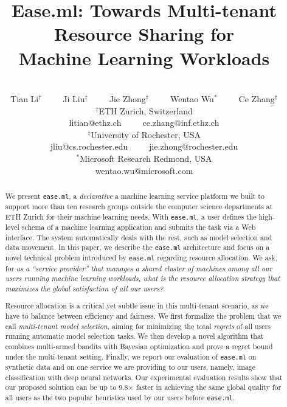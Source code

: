 \documentclass[letterpaper]{vldb}
\newcommand{\eml}{\texttt{ease.ml}\xspace}
\begin{document}


\title{Ease.ml: Towards Multi-tenant Resource Sharing for \\
Machine Learning Workloads}

\author{
\vspace{-1.1em}
~\\
Tian Li$^\dagger$~~~~~Ji Liu$^\ddagger$~~~~~Jie Zhong$^\ddagger$~~~~~Wentao Wu$^*$~~~~~Ce Zhang$^\dagger$\\
\small $^\dagger$ETH Zurich, Switzerland\\
\small litian@ethz.ch~~~~~ce.zhang@inf.ethz.ch\\
\small $^\ddagger$University of Rochester, USA\\
\small jliu@cs.rochester.edu~~~~~jie.zhong@rochester.edu\\
\small $^*$Microsoft Research Redmond, USA\\
\small wentao.wu@microsoft.com
}

\maketitle

\begin{abstract}
We present \eml, a \emph{declarative} a machine learning service platform we built
to support more than ten research groups outside the computer science departments at ETH Zurich 
for their machine learning needs.
With \eml, a user defines the high-level 
schema of a machine learning application and submits
the task via a Web interface. The system automatically deals with the rest, such as model selection and data movement.
In this paper, we describe the \eml architecture and focus on
a novel technical problem introduced by \eml regarding resource allocation.
We ask, {for \em as a ``service provider'' that manages a shared cluster of 
machines among all our users running machine learning workloads, what is the resource
allocation strategy that maximizes the global satisfaction of all
our users?}


Resource allocation is a critical yet subtle issue in this multi-tenant scenario, as we 
have to balance between efficiency and fairness.
We first formalize the problem that we call {\em multi-tenant model selection}, 
aiming for minimizing the total {\em regrets} of all users
running automatic model selection tasks.
We then develop a novel algorithm that combines multi-armed bandits with Bayesian 
optimization and prove a regret bound 
under the multi-tenant setting.
Finally, we report our evaluation of \eml on synthetic data and on one service 
we are providing to our users, namely, 
image classification with deep neural networks.
Our experimental evaluation results show that our proposed solution can 
be up to 9.8$\times$ faster in achieving the same global quality
for all users as the %
two popular heuristics used by our users before \eml.

\end{abstract} 
\end{document}
